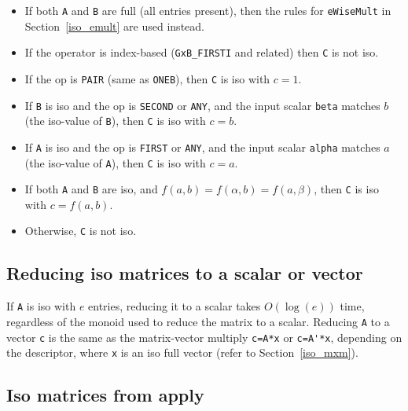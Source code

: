     \begin{itemize}
    \item If both \verb'A' and \verb'B' are full (all entries present), then
    the rules for \verb'eWiseMult' in Section~\ref{iso_emult} are used
    instead.

    \item If the operator is index-based (\verb'GxB_FIRSTI' and related) then
    \verb'C' is not iso.

    \item If the op is \verb'PAIR' (same as \verb'ONEB'),
        then \verb'C' is iso with $c=1$.

    \item If \verb'B' is iso and the op is \verb'SECOND' or \verb'ANY',
        and the input scalar \verb'beta' matches $b$
        (the iso-value of \verb'B'),
        then \verb'C' is iso with $c=b$.

    \item If \verb'A' is iso and the op is \verb'FIRST' or \verb'ANY',
        and the input scalar \verb'alpha' matches $a$
        (the iso-value of \verb'A'),
        then \verb'C' is iso with $c=a$.

    \item If both \verb'A' and \verb'B' are iso,
        and $f(a,b) = f(\alpha,b) = f(a,\beta)$,
        then \verb'C' is iso with $c=f(a,b)$.

    \item Otherwise, \verb'C' is not iso.
    \end{itemize}

\subsection{Reducing iso matrices to a scalar or vector}
\label{iso_reduce}

If \verb'A' is iso with $e$ entries, reducing it to a scalar takes $O(\log(e))$
time, regardless of the monoid used to reduce the matrix to a scalar.  Reducing
\verb'A' to a vector \verb'c' is the same as the matrix-vector multiply
\verb"c=A*x" or \verb"c=A'*x", depending on the descriptor, where \verb'x'
is an iso full vector (refer to Section~\ref{iso_mxm}).

\subsection{Iso matrices from apply}
\label{iso_apply}

